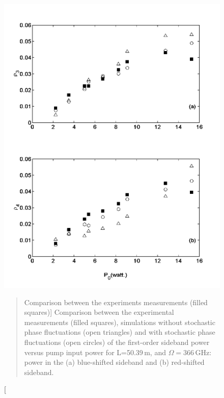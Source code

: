 \begin{figure}
\hspace{1.25in}
\includegraphics[width=5in]{nlsefinal.pdf}
\renewcommand{\baselinestretch}{1}
\small\normalsize
\begin{quote}
\caption
[Comparison between the experiments measurements (filled squares)]
{Comparison between the experimental measurements (filled squares), simulations without stochastic phase fluctuations (open triangles) and with stochastic phase fluctuations (open circles) of the first-order sideband power versus pump input power for L=50.39\,m, and $\Omega = 366$\,GHz: power in the (a) blue-shifted sideband and (b) red-shifted sideband.}
\label{figA.8}
\end{quote}
\end{figure}
\renewcommand{\baselinestretch}{2}
\small\normalsize

